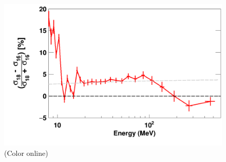 \begin{figure}
    \includegraphics[scale=0.35]{figures/relativeDiff_O18O16.png}
    \caption{(Color online) 
    }
    \label{IsotopicDifferenceO}
\end{figure}

